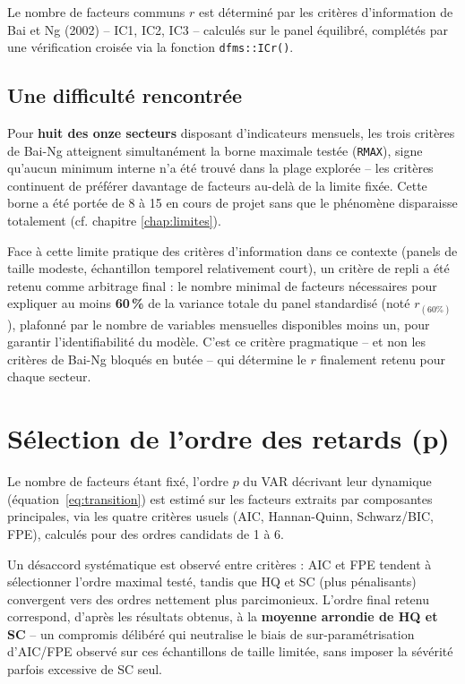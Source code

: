 \documentclass[11pt,a4paper]{report}
\newcommand{\code}[1]{\texttt{#1}}
\begin{document}
Le nombre de facteurs communs $r$ est déterminé par les critères d'information de Bai et Ng (2002) -- IC1, IC2, IC3 -- calculés sur le panel équilibré, complétés par une vérification croisée via la fonction \code{dfms::ICr()}.

\subsection{Une difficulté rencontrée}

Pour \textbf{huit des onze secteurs} disposant d'indicateurs mensuels, les trois critères de Bai-Ng atteignent simultanément la borne maximale testée (\code{RMAX}), signe qu'aucun minimum interne n'a été trouvé dans la plage explorée -- les critères continuent de préférer davantage de facteurs au-delà de la limite fixée. Cette borne a été portée de 8 à 15 en cours de projet sans que le phénomène disparaisse totalement (cf. chapitre \ref{chap:limites}).

Face à cette limite pratique des critères d'information dans ce contexte (panels de taille modeste, échantillon temporel relativement court), un critère de repli a été retenu comme arbitrage final : le nombre minimal de facteurs nécessaires pour expliquer au moins \textbf{60\,\%} de la variance totale du panel standardisé (noté $r_{(60\%)}$), plafonné par le nombre de variables mensuelles disponibles moins un, pour garantir l'identifiabilité du modèle. C'est ce critère pragmatique -- et non les critères de Bai-Ng bloqués en butée -- qui détermine le $r$ finalement retenu pour chaque secteur.

\section{Sélection de l'ordre des retards (p)}

Le nombre de facteurs étant fixé, l'ordre $p$ du VAR décrivant leur dynamique (équation~\ref{eq:transition}) est estimé sur les facteurs extraits par composantes principales, via les quatre critères usuels (AIC, Hannan-Quinn, Schwarz/BIC, FPE), calculés pour des ordres candidats de 1 à 6.

Un désaccord systématique est observé entre critères : AIC et FPE tendent à sélectionner l'ordre maximal testé, tandis que HQ et SC (plus pénalisants) convergent vers des ordres nettement plus parcimonieux. L'ordre final retenu correspond, d'après les résultats obtenus, à la \textbf{moyenne arrondie de HQ et SC} -- un compromis délibéré qui neutralise le biais de sur-paramétrisation d'AIC/FPE observé sur ces échantillons de taille limitée, sans imposer la sévérité parfois excessive de SC seul.
\end{document}
